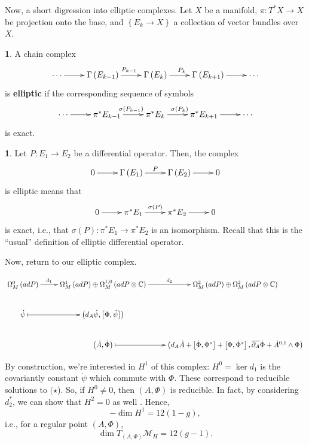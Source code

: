 \documentclass[oneside,english]{amsbook}
\numberwithin{section}{chapter}
\numberwithin{equation}{section}
\numberwithin{figure}{section}
\theoremstyle{plain}
\theoremstyle{definition}
\newtheorem{defn}[thm]{\protect\definitionname}
\theoremstyle{remark}
\theoremstyle{definition}
\newtheorem*{example*}{\protect\examplename}
\theoremstyle{definition}
\theoremstyle{plain}
\providecommand{\definitionname}{Definition}
\providecommand{\examplename}{Example}
\begin{document}
Now, a short digression into elliptic complexes. Let $X$ be a manifold,
$\pi:T^{*}X\rightarrow X$ be projection onto the base, and $\left\{ E_{k}\rightarrow X\right\} $
a collection of vector bundles over $X$.
\begin{defn}
A chain complex
\[
\xymatrix{\cdots\ar[r] & \Gamma\left(E_{k-1}\right)\ar[r]^{P_{k-1}} & \Gamma\left(E_{k}\right)\ar[r]^{P_{k}} & \Gamma\left(E_{k+1}\right)\ar[r] & \cdots}
\]
is \textbf{elliptic} if the corresponding sequence of symbols
\[
\xymatrix{\cdots\ar[r] & \pi^{*}E_{k-1}\ar[r]^{\sigma\left(P_{k-1}\right)} & \pi^{*}E_{k}\ar[r]^{\sigma\left(P_{k}\right)} & \pi^{*}E_{k+1}\ar[r] & \cdots}
\]
is exact.\end{defn}
\begin{example*}
Let $P:E_{1}\rightarrow E_{2}$ be a differential operator. Then,
the complex
\[
\xymatrix{0\ar[r] & \Gamma\left(E_{1}\right)\ar[r]^{P} & \Gamma\left(E_{2}\right)\ar[r] & 0}
\]
is elliptic means that
\[
\xymatrix{0\ar[r] & \pi^{*}E_{1}\ar[r]^{\sigma\left(P\right)} & \pi^{*}E_{2}\ar[r] & 0}
\]
is exact, i.e., that $\sigma\left(P\right):\pi^{*}E_{1}\rightarrow\pi^{*}E_{2}$
is an isomorphism. Recall that this is the ``usual'' definition
of elliptic differential operator.
\end{example*}
Now, return to our elliptic complex.

\[
\xymatrix{\Omega_{M}^{0}\left(adP\right)\ar[r]^-{d_{1}} & \Omega_{M}^{1}\left(adP\right)\oplus\Omega_{M}^{1,0}\left(adP\otimes\mathbb{C}\right)\ar[r]^-{d_{2}} &
\Omega_{M}^{2}\left(adP\right)\oplus\Omega_{M}^{2}\left(adP\otimes\mathbb{C}\right)\\
\dot{\psi}\ar@{|->}[r] & \left(d_{A}\dot{\psi},\left[\Phi,\dot{\psi}\right]\right)\\
 & \left(\dot{A},\dot{\Phi}\right)\ar@{|->}[r] &
 \left(d_{A}\dot{A}+\left[\dot{\Phi},\Phi^{*}\right]+\left[\Phi,\dot{\Phi}^{*}\right],\overline{\partial_{A}}\dot{\Phi}+\dot{A}^{0,1}\wedge\Phi\right)
}
\]

By construction, we're interested in $H^{1}$ of this complex: $H^{0}=\ker d_{1}$
is the covariantly constant $\dot{\psi}$ which commute with $\Phi$.
These correspond to reducible solutions to $(\star$). So, if $H^{0}\neq0$,
then $\left(A,\Phi\right)$ is reducible. In fact, by considering
$d_{2}^{*}$, we can show that $H^{2}=0$ as well \cite{H1}. Hence,
\[
-\dim H^{1}=12\left(1-g\right),
\]
i.e., for a regular point $\left(A,\Phi\right)$,
\[
\boxed{\dim T_{\left(A,\Phi\right)}\mathcal{M}_{H}=12\left(g-1\right)}.
\]
\end{document}

